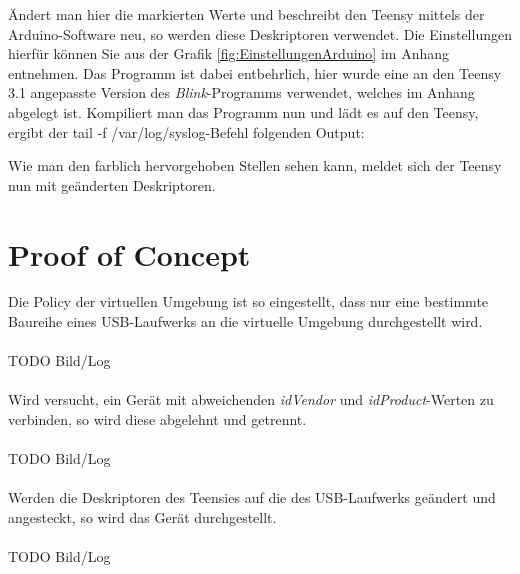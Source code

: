 \lstset{language=C}


Ändert man hier die markierten Werte und beschreibt den Teensy mittels der Arduino-Software neu, so werden diese Deskriptoren verwendet. Die Einstellungen hierfür können Sie aus der Grafik \ref{fig:EinstellungenArduino} im Anhang entnehmen. Das Programm ist dabei entbehrlich, hier wurde eine an den Teensy 3.1 angepasste Version des \textit{Blink}-Programms verwendet, welches im Anhang abgelegt ist. Kompiliert man das Programm nun und lädt es auf den Teensy, ergibt der \glqq tail -f /var/log/syslog\grqq -Befehl folgenden Output:

\lstset{language=log}


Wie man den farblich hervorgehoben Stellen sehen kann, meldet sich der Teensy nun mit geänderten Deskriptoren.

\section{Proof of Concept} \label{PoC}
Die Policy der virtuellen Umgebung ist so eingestellt, dass nur eine  bestimmte Baureihe eines USB-Laufwerks an die virtuelle Umgebung durchgestellt wird.\\
\\
TODO Bild/Log\\
\\
Wird versucht, ein Gerät mit abweichenden \textit{idVendor} und \textit{idProduct}-Werten zu verbinden, so wird diese abgelehnt und getrennt.\\
\\
TODO Bild/Log\\
\\
Werden die Deskriptoren des Teensies auf die des USB-Laufwerks geändert und angesteckt, so wird das Gerät durchgestellt.\\
\\
TODO Bild/Log